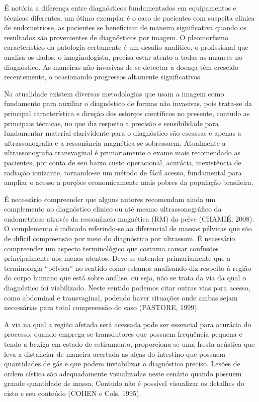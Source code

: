 \documentclass[12pt]{article} %
\begin{document}
É notória a diferença entre diagnósticos fundamentados em equipamentos e técnicas diferentes, um ótimo exemplar é o caso de pacientes com suspeita clinica de endometriose, as pacientes se beneficiam de maneira significativa quando os resultados são provenientes de diagnósticos por imagem. O pleomorfismo característico da patologia certamente é um desafio analítico, o profissional que analisa os dados, o imaginologista, precisa estar atento a todas as nuances no diagnóstico. As maneiras não invasivas de se detectar a doença têm crescido recentemente, o ocasionando progressos altamente significativos. 

Na atualidade existem diversas metodologias que usam a imagem como fundamento para auxiliar o diagnóstico de formas não invasivas, pois trata-se da principal característica e direção dos esforços científicos no presente, contudo as principais técnicas, no que diz respeito a precisão e sensibilidade para fundamentar material clarividente para o diagnóstico são escassas e apenas a ultrassonografia e a ressonância magnética se sobressaem. Atualmente a ultrassonografia transvaginal é primariamente o exame mais recomendado as pacientes, por conta de seu baixo custo operacional, acurácia, inexistência de radiação ionizante, tornando-se um método de fácil acesso, fundamental para ampliar o acesso a porções economicamente mais pobres da população brasileira.

É necessário compreender que alguns autores recomendam ainda um complemento ao diagnóstico clinico ou até mesmo ultrassonográfico da endometriose através da ressonância magnética (RM) da pelve (CHAMIÉ, 2008). O complemento é indicado referindo-se ao diferencial de massas pélvicas que são de difícil compreensão por meio do diagnóstico por ultrassom. 
É necessário compreender um aspecto terminológico que costuma causar confusões principalmente aos menos atentos. Deve se entender primariamente que a terminologia “pélvica” no sentido como estamos analisando diz respeito à região do corpo humano que está sobre análise, ou seja, não se trata da via da qual o diagnóstico foi viabilizado. Neste sentido podemos citar outras vias para acesso, como abdominal e transvaginal, podendo haver situações onde ambas sejam necessárias para total compreensão do caso (PASTORE, 1999).

A via na qual a região afetada será acessada pode ser essencial para acurácia do processo; quando emprega-se transdutores que possuem frequência pequena e tendo a bexiga em estado de estiramento, proporciona-se uma fresta acústica que leva a distanciar de maneira acertada as alças do intestino que possuem quantidades  de gás e que podem inviabilizar o diagnóstico preciso. Lesões de ordem cística são adequadamente visualizadas neste cenário quando possuem grande quantidade de massa. Contudo não é possível visualizar os detalhes do cisto e seu conteúdo (COHEN e Cols, 1995).
\end{document}
